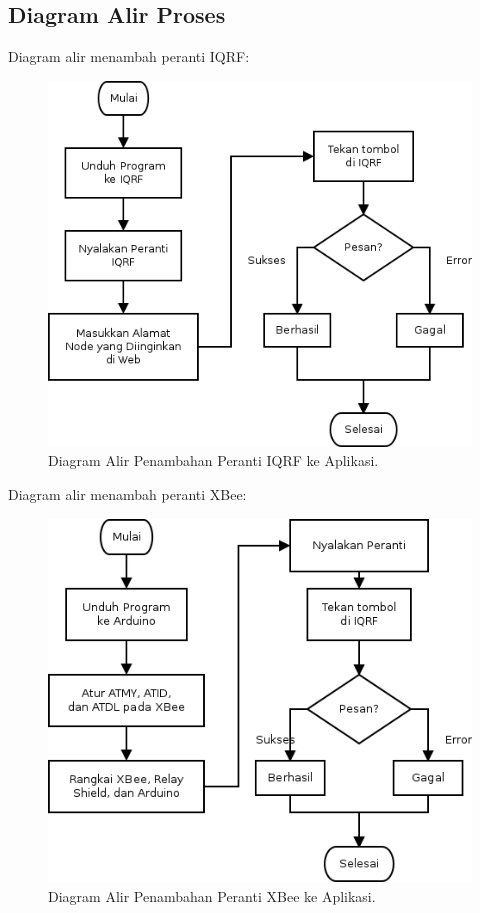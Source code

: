 		\subsection{Diagram Alir Proses}
			Diagram alir menambah peranti IQRF:

			\begin{figure}[ht!]
			  \centering
			    \includegraphics{gambar/add-iqrf}
			    \caption{Diagram Alir Penambahan Peranti IQRF ke Aplikasi.}
			    \label{add-iqrf}
			\end{figure}

			Diagram alir menambah peranti XBee:

			\begin{figure}[ht!]
			  \centering
			    \includegraphics{gambar/add-xbee}
			    \caption{Diagram Alir Penambahan Peranti XBee ke Aplikasi.}
			    \label{add-xbee}
			\end{figure}

